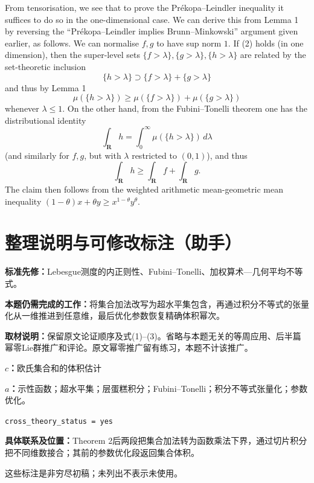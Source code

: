 \documentclass[UTF8,11pt,a4paper]{ctexart}
\theoremstyle{definition}\newtheorem*{definition}{Definition}
\theoremstyle{remark}\newtheorem*{remark}{Remark}
\begin{document}
From tensorisation, we see that to prove the Pr\'ekopa--Leindler inequality it suffices to do so in the one-dimensional case. We can derive this from Lemma 1 by reversing the ``Pr\'ekopa--Leindler implies Brunn--Minkowski'' argument given earlier, as follows. We can normalise $f,g$ to have sup norm $1$. If (2) holds (in one dimension), then the super-level sets $\{f>\lambda\},\{g>\lambda\},\{h>\lambda\}$ are related by the set-theoretic inclusion
\[
\{h>\lambda\}\supset\{f>\lambda\}+\{g>\lambda\}
\]
and thus by Lemma 1
\[
\mu(\{h>\lambda\})\geq\mu(\{f>\lambda\})+\mu(\{g>\lambda\})
\]
whenever $\lambda\leq1$. On the other hand, from the Fubini--Tonelli theorem one has the distributional identity
\[
\int_{\mathbf R}h=\int_0^\infty\mu(\{h>\lambda\})\,d\lambda
\]
(and similarly for $f,g$, but with $\lambda$ restricted to $(0,1)$), and thus
\[
\int_{\mathbf R}h\geq\int_{\mathbf R}f+\int_{\mathbf R}g.
\]
The claim then follows from the weighted arithmetic mean-geometric mean inequality $(1-\theta)x+\theta y\geq x^{1-\theta}y^\theta$.

\section*{整理说明与可修改标注（助手）}
\textbf{标准先修：}Lebesgue测度的内正则性、Fubini--Tonelli、加权算术—几何平均不等式。

\textbf{本题仍需完成的工作：}将集合加法改写为超水平集包含，再通过积分不等式的张量化从一维推进到任意维，最后优化参数恢复精确体积幂次。

\textbf{取材说明：}保留原文论证顺序及式(1)--(3)。省略与本题无关的等周应用、后半篇幂零Lie群推广和评论。原文幂零推广留有练习，本题不计该推广。

\textbf{$c$：}欧氏集合和的体积估计

\textbf{$a$：}示性函数；超水平集；层蛋糕积分；Fubini--Tonelli；积分不等式张量化；参数优化。

\texttt{cross\_theory\_status = yes}

\textbf{具体联系及位置：}Theorem 2后两段把集合加法转为函数乘法下界，通过切片积分把不同维数接合；其前的参数优化段返回集合体积。

这些标注是非穷尽初稿；未列出不表示未使用。
\end{document}
